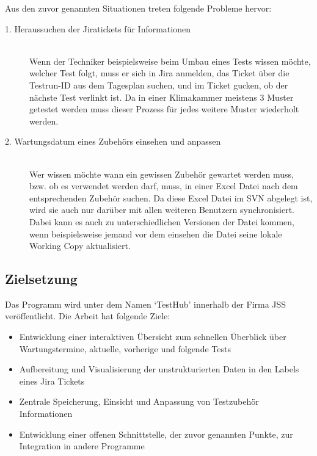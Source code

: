 \pagebreak
Aus den zuvor genannten Situationen treten folgende Probleme hervor:

\begin{description}

    \item[1. Heraussuchen der Jiratickets für Informationen]\hfill \\
    Wenn der Techniker beispielsweise beim Umbau eines Tests wissen möchte,
    welcher Test folgt, muss er sich in Jira anmelden, das Ticket über die
    Testrun-ID aus dem Tagesplan suchen, und im Ticket gucken, ob der nächste 
    Test verlinkt ist. Da in einer Klimakammer meistens 3 Muster getestet werden
    muss dieser Prozess für jedes weitere Muster wiederholt werden.
    

    \item[2. Wartungsdatum eines Zubehörs einsehen und anpassen]\hfill \\
    Wer wissen möchte wann ein gewissen Zubehör gewartet werden muss, bzw. ob 
    es verwendet werden darf, muss, in einer Excel Datei nach dem entsprechenden
    Zubehör suchen. Da diese Excel Datei im \gls{SVN} abgelegt ist, wird sie auch nur
    darüber mit allen weiteren Benutzern synchronisiert. Dabei kann es auch zu 
    unterschiedlichen Versionen der Datei kommen, wenn beispielsweise jemand 
    vor dem einsehen die Datei seine lokale Working Copy aktualisiert.


\end{description}


\subsection{Zielsetzung}
Das Programm wird unter dem Namen `TestHub' innerhalb der Firma \gls{JSS} 
veröffentlicht. Die Arbeit hat folgende Ziele:

\begin{itemize}
\item Entwicklung einer interaktiven Übersicht zum schnellen Überblick über Wartungstermine, aktuelle, vorherige und folgende Tests 
\item Aufbereitung und Visualisierung der unstrukturierten Daten in den Labels eines Jira Tickets
\item Zentrale Speicherung, Einsicht und Anpassung von Testzubehör Informationen
\item Entwicklung einer offenen Schnittstelle, der zuvor genannten Punkte, zur Integration in andere Programme

\end{itemize}

